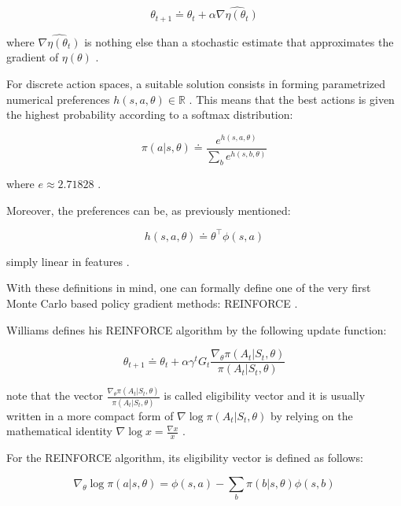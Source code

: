 \documentclass{seal_thesis}
\begin{document}
\begin{equation}
	\theta_{t+1} \doteq \theta_t + \alpha \widehat{\nabla \eta (\theta_t)}
\end{equation}

where $ \widehat{\nabla \eta (\theta_t)}$ is nothing else than a stochastic estimate that approximates the gradient of $\eta(\theta)$ \cite[p. 265]{Sutton2017}.

For discrete action spaces, a suitable solution consists in forming parametrized numerical preferences $h(s,a,\theta) \in \mathbb{R}$ \cite[p. 266]{Sutton2017}. This means that the best actions is given the highest probability according to a softmax distribution:

\begin{equation}
\label{eq:probabilistic_preferences}
	\pi(a|s,\theta) \doteq \frac{e^{h(s,a,\theta)}}{\sum_b e^{h(s,b,\theta)}}
\end{equation}

where $e \approx 2.71828$ \cite[p. 266]{Sutton2017}.

Moreover, the preferences can be, as previously mentioned:

\begin{equation}
\label{eq:dot_preferences}
	h(s,a,\theta) \doteq \theta^\top \phi (s,a)
\end{equation}

\ie simply linear in features \cite[p. 266]{Sutton2017}.

With these definitions in mind, one can formally define one of the very first Monte Carlo based policy gradient methods: REINFORCE \cite{Williams1992}.

Williams defines his REINFORCE algorithm by the following update function:

\begin{equation}
	\theta_{t+1} \doteq \theta_t + \alpha \gamma^t G_t \frac{\nabla_\theta \pi(A_t|S_t,\theta)}{\pi(A_t|S_t,\theta)}
\end{equation}

note that the vector $\frac{\nabla_\theta \pi(A_t|S_t,\theta)}{\pi(A_t|S_t,\theta)}$ is called eligibility vector and it is usually written in a more compact form of $\nabla \log \pi(A_t|S_t,\theta)$ by relying on the mathematical identity $\nabla \log x = \frac{\nabla x}{x}$ \cite[p. 271]{Sutton2017}.

For the REINFORCE algorithm, its eligibility vector is defined as follows:

\begin{equation}
	\nabla_\theta \log \pi (a|s,\theta) = \phi (s,a) - \sum_b \pi (b|s,\theta) \phi (s,b)
\end{equation}
\end{document}
